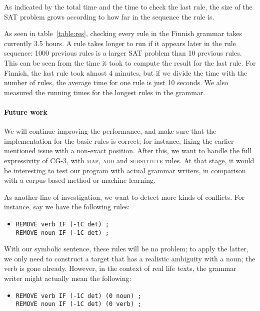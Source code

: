 As indicated by the total time and the time to check the last rule, the size of the SAT problem grows according to how far in the sequence the rule is.

As seen in table~\ref{table:res}, checking every rule in the Finnish grammar takes currently 3.5 hours.
A rule takes longer to run if it appears later in the rule sequence: 1000 previous rules is a larger SAT problem than 10 previous rules.
This can be seen from the time it took to compute the result for the last rule. For Finnish, the last rule took almost 4 minutes, but if we divide the time with the number of rules, the average time for one rule is just 10 seconds.
We also measured the running times for the longest rules in the grammar.


\paragraph{Future work} We will continue improving the performance, and make sure that the implementation for the basic rules is correct; for instance, fixing the earlier mentioned issue with a non-exact position.
After this, we want to handle the full expressivity of CG-3, with \textsc{map}, \textsc{add} and \textsc{substitute} rules.
At that stage, it would be interesting to test our program with actual grammar writers,
in comparison with a corpus-based method or machine learning.

As another line of investigation, we want to detect more kinds of conflicts.
For instance, say we have the following rules:

\begin{itemize}
\item[] \begin{verbatim}
REMOVE verb IF (-1C det) ;
REMOVE noun IF (-1C det) ;
\end{verbatim}
\end{itemize}

With our symbolic sentence, these rules will be no problem; to apply the latter, we only need to construct a target that has a realistic ambiguity with a noun; the verb is gone already.
However, in the context of real life texts, the grammar writer might actually mean the following:

\begin{itemize}
\item[] \begin{verbatim}
REMOVE verb IF (-1C det) (0 noun) ;
REMOVE noun IF (-1C det) (0 verb) ;
\end{verbatim}
\end{itemize}

